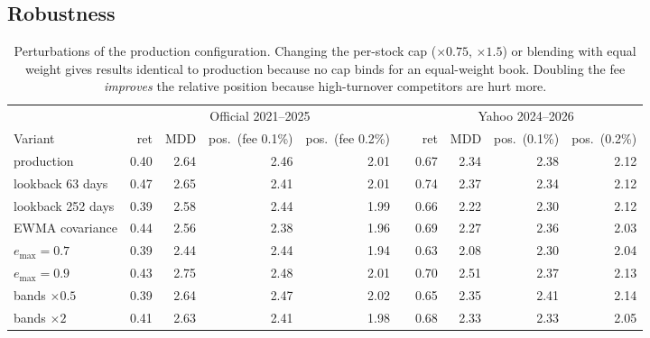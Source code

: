 \documentclass[11pt,a4paper]{article}
\begin{document}
\subsection{Robustness}
\begin{table}[h]
\centering\footnotesize
\setlength{\tabcolsep}{3.5pt}
\begin{tabular}{lrrrrcrrrr}
\toprule
 & \multicolumn{4}{c}{Official 2021--2025} & & \multicolumn{4}{c}{Yahoo 2024--2026} \\
\cmidrule{2-5}\cmidrule{7-10}
Variant & ret & MDD & pos.\ (fee 0.1\%) & pos.\ (fee 0.2\%) & & ret & MDD & pos.\ (0.1\%) & pos.\ (0.2\%) \\
\midrule
production & 0.40 & 2.64 & 2.46 & 2.01 & & 0.67 & 2.34 & 2.38 & 2.12 \\
lookback 63 days & 0.47 & 2.65 & 2.41 & 2.01 & & 0.74 & 2.37 & 2.34 & 2.12 \\
lookback 252 days & 0.39 & 2.58 & 2.44 & 1.99 & & 0.66 & 2.22 & 2.30 & 2.12 \\
EWMA covariance & 0.44 & 2.56 & 2.38 & 1.96 & & 0.69 & 2.27 & 2.36 & 2.03 \\
$e_{\max}=0.7$ & 0.39 & 2.44 & 2.44 & 1.94 & & 0.63 & 2.08 & 2.30 & 2.04 \\
$e_{\max}=0.9$ & 0.43 & 2.75 & 2.48 & 2.01 & & 0.70 & 2.51 & 2.37 & 2.13 \\
bands $\times0.5$ & 0.39 & 2.64 & 2.47 & 2.02 & & 0.65 & 2.35 & 2.41 & 2.14 \\
bands $\times2$ & 0.41 & 2.63 & 2.41 & 1.98 & & 0.68 & 2.33 & 2.33 & 2.05 \\
\bottomrule
\end{tabular}
\caption{Perturbations of the production configuration. Changing the per-stock cap ($\times0.75$, $\times1.5$) or
blending with equal weight gives results identical to production because no cap binds for an equal-weight book.
Doubling the fee \emph{improves} the relative position because high-turnover competitors are hurt more.}
\label{tab:robust}
\end{table}
\end{document}
